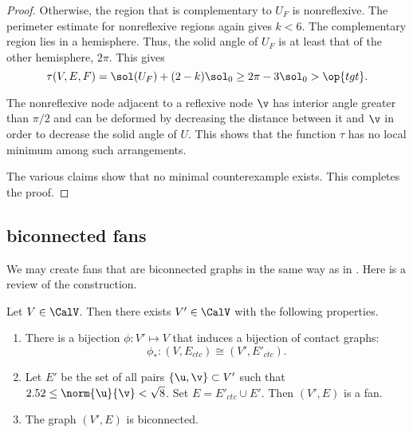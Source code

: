 \begin{proof}
  Otherwise, the region that is complementary
to $U_F$ is nonreflexive.  The perimeter estimate for nonreflexive regions again
gives $k<6$.  The complementary region lies in a hemisphere.  Thus,
the solid angle of $U_F$ is at least that of the other hemisphere,
$2\pi$.
%
This gives
\[
\tau(V,E,F) = \sol(U_F) + (2-k)\sol_0 \ge 2\pi - 3\sol_0 > \op{tgt}.
\]


The nonreflexive node adjacent to a reflexive node $\v$ has interior angle greater
than $\pi/2$ and can be deformed by decreasing the distance between it
and $\v$ in order to decrease the solid angle of $U$.  This shows that the
function $\tau$ has no local minimum among such arrangements.


The various claims show that no minimal counterexample exists.  This
completes the proof.
\end{proof}

\subsection{biconnected fans}


We may create  fans that are biconnected graphs in the same way as in
\cite{Hales:2006:DCG}.  Here is a review
of the construction.



\begin{lemma}\label{lemma:V'-bi} 
Let $V\in \CalV$.  Then there exists $V'\in \CalV$ with
  the following  properties.
\begin{enumerate}\wasitemize 
\item There is a bijection $\phi:V'\mapsto V$ that induces a bijection
  of contact graphs:
\[
\phi_*:(V,E_{ctc}) \cong (V',E'_{ctc}).
\]
\item Let $E'$ be the set of all pairs $\{\u,\v\}\subset V'$
  such that $2.52\le\norm{\u}{\v} <\sqrt8$.  Set $E =
  E'_{ctc}\cup E'$.  Then $(V',E)$ is a fan.
\item The graph $(V',E)$ is biconnected.
\end{enumerate}\wasitemize 
\end{lemma}

